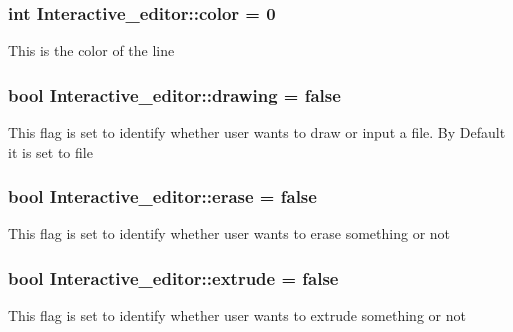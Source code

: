 \subsubsection[{\texorpdfstring{color}{color}}]{\setlength{\rightskip}{0pt plus 5cm}int Interactive\+\_\+editor\+::color = 0}\hypertarget{classInteractive__editor_a8bb78acdc55bebbe34bc545eb720217c}{}\label{classInteractive__editor_a8bb78acdc55bebbe34bc545eb720217c}
This is the color of the line 
\subsubsection[{\texorpdfstring{drawing}{drawing}}]{\setlength{\rightskip}{0pt plus 5cm}bool Interactive\+\_\+editor\+::drawing = false}\hypertarget{classInteractive__editor_ace62b483a0866c64212ee0c641445c7a}{}\label{classInteractive__editor_ace62b483a0866c64212ee0c641445c7a}
This flag is set to identify whether user wants to draw or input a file. By Default it is set to file 
\subsubsection[{\texorpdfstring{erase}{erase}}]{\setlength{\rightskip}{0pt plus 5cm}bool Interactive\+\_\+editor\+::erase = false}\hypertarget{classInteractive__editor_ac2f2f1dfb6c21585d4ed5ed043e41b25}{}\label{classInteractive__editor_ac2f2f1dfb6c21585d4ed5ed043e41b25}
This flag is set to identify whether user wants to erase something or not 
\subsubsection[{\texorpdfstring{extrude}{extrude}}]{\setlength{\rightskip}{0pt plus 5cm}bool Interactive\+\_\+editor\+::extrude = false}\hypertarget{classInteractive__editor_a3e4db48e715e92969ba3ec52ab14ce8d}{}\label{classInteractive__editor_a3e4db48e715e92969ba3ec52ab14ce8d}
This flag is set to identify whether user wants to extrude something or not 
